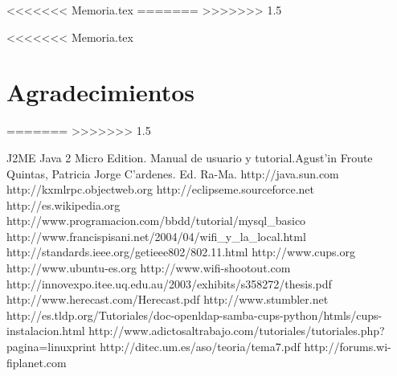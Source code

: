 \documentclass[a4paper,12pt]{article}
\begin{document}
<<<<<<< Memoria.tex
\pagebreak
=======
\pagebreak	
>>>>>>> 1.5

<<<<<<< Memoria.tex
\section{Agradecimientos}
	

\pagebreak	

\printindex
=======
\printindex
>>>>>>> 1.5

\begin{thebibliography}{XXX}

	J2ME Java 2 Micro Edition. Manual de usuario y tutorial.Agust'in Froute Quintas, Patricia Jorge C'ardenes. Ed. Ra-Ma.
	http://java.sun.com
	http://kxmlrpc.objectweb.org
	  http://eclipseme.sourceforce.net
	 http://es.wikipedia.org
	http://www.programacion.com/bbdd/tutorial/mysql\_basico
http://www.francispisani.net/2004/04/wifi\_y\_la\_local.html
	http://standards.ieee.org/getieee802/802.11.html
	http://www.cups.org
	http://www.ubuntu-es.org
	http://www.wifi-shootout.com
	http://innovexpo.itee.uq.edu.au/2003/exhibits/s358272/thesis.pdf
	http://www.herecast.com/Herecast.pdf
	http://www.stumbler.net
http://es.tldp.org/Tutoriales/doc-openldap-samba-cups-python/htmls/cups-instalacion.html
http://www.adictosaltrabajo.com/tutoriales/tutoriales.php?pagina=linuxprint
	http://ditec.um.es/aso/teoria/tema7.pdf
	http://forums.wi-fiplanet.com
	
\end{thebibliography}
\end{document}
